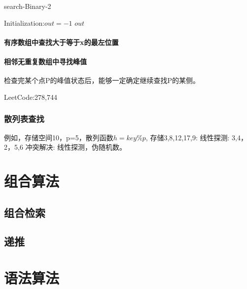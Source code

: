 \documentclass[UTF8]{../computerUniverse}
\begin{document}
      \begin{algorithm}[h]%
        \caption{search-Binary-2}\label{algo:search_Binary_2}
        \SetAlgoLined
        Initialization:$out = -1$\;
        \KwRet $out$\;
      \end{algorithm}


\subsubsection{有序数组中查找大于等于x的最左位置}

\subsubsection{相邻无重复数组中寻找峰值}
检查完某个点P的峰值状态后，能够一定确定继续查找P的某侧。


LeetCode:278,744

\subsection{散列表查找}
例如，存储空间10，p=5，散列函数$h=key\%p$,
存储3,8,12,17,9: 线性探测:  3,4，2，5,6
冲突解决: 线性探测，伪随机数。







\chapter{组合算法}

\section{组合检索}

\section{递推}




\chapter{语法算法}
\end{document}
